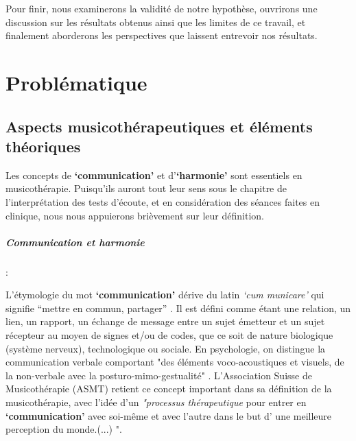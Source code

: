 Pour finir, nous examinerons la validité de notre hypothèse, ouvrirons
une discussion sur les résultats obtenus ainsi que les limites de ce
travail, et finalement aborderons les perspectives que
laissent entrevoir nos résultats.


\chapter{Problématique}

\section{Aspects musicothérapeutiques et éléments théoriques}
Les concepts de \textbf{`communication'} et  d'\textbf{`harmonie'}
sont essentiels en
musicothérapie. Puisqu'ils auront tout  leur sens sous le chapitre de l'interprétation des tests
d'écoute, et en considération des séances faites en clinique, nous nous appuierons brièvement
sur leur définition. 
\paragraph{Communication et harmonie}:


L'étymologie du mot  \textbf{`communication'} dérive du latin  \textit{`cum
  municare'} qui signifie ``mettre en commun, partager'' \autocite{dicpetitrobert}.
Il est défini comme étant une
relation, un lien, un rapport, un échange de message entre un sujet émetteur et un
sujet récepteur au moyen de signes et/ou de codes, que ce soit de nature biologique (système nerveux), technologique ou sociale. En psychologie, on distingue la communication verbale comportant "des éléments voco-acoustiques et visuels, de la non-verbale avec la posturo-mimo-gestualité" \autocite{doronparot}.
L'Association Suisse
de Musicothérapie (ASMT) retient ce concept important dans sa définition de la musicothérapie, avec l'idée  d'un\textit{ "processus thérapeutique }pour entrer en \textbf{`communication'} avec soi-même et avec
l'autre dans le but d' une meilleure perception du
monde.(...) "\autocite{site_musitherapy}.

